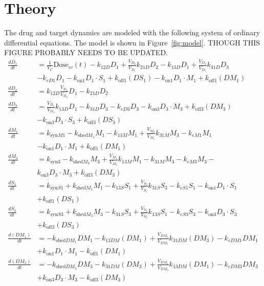 \section*{Theory}

The drug and target dynamics are modeled with the following system of ordinary differential equations.  The model is shown in Figure~\ref{fig:model}.  THOUGH THIS FIGURE PROBABLY NEEDS TO BE UPDATED.
\begin{align}
\frac{dD_1}{dt} &= \frac{1}{V_C}\text{Dose}_{iv}(t) - k_{12D}D_1 + \frac{V_{D_2}}{V_{D_1}}k_{21D}D_2 - k_{13D}D_1 \nonumber 
+ \frac{V_{D_3}}{V_{D_1}}k_{31D}D_3\\& - k_{eD1}D_1 - k_{\text{on}1}D_1 \cdot S_1 + k_{\text{off}1}(DS_1)- k_{\text{on}1}D_1 \cdot M_1 + k_{\text{off}1}(DM_1)  \\
\frac{dD_2}{dt} &= k_{12D}\frac{V_{D_1}}{V_{D_2}}D_1 - k_{21D}D_2 \\
\frac{dD_3}{dt} &= \frac{V_{D_1}}{V_{D_3}}k_{13D}D_1 - k_{31D}D_3 - k_{eD3}D_3- k_{\text{on}3}D_3 \cdot M_3 + k_{\text{off}3}(DM_3)\nonumber  \\&- k_{\text{on}3}D_3 \cdot S_3 + k_{\text{off}3}(DS_3) \\
\frac{dM_1}{dt} &= k_{\text{syn}M1}-k_{\text{shed}M_1}M_1 - k_{13M}M_1 + \frac{V_{M_3}}{V_{M_1}}k_{31M}M_3- k_{eM1}M_1\nonumber  \\&- k_{\text{on}1}D_1 \cdot M_1 + k_{\text{off}1}(DM_1)  \\
\frac{dM_3}{dt} &= k_{\text{syn}3}-k_{\text{shed}M_3}M_3  + \frac{V_{M_1}}{V_{M_3}}k_{13M}M_1 - k_{31M}M_3 - k_{eM3}M_3-\nonumber \\& k_{\text{on}3}D_3 \cdot M_3 + k_{\text{off}3}(DM_3) \\
\frac{dS_1}{dt} &= k_{\text{syn}S1}+k_{\text{shed}M_1}M_1  - k_{13S}S_1 + \frac{V_{S_3}}{V_{S_1}}k_{31S}S_3 - k_{eS1}S_1 - k_{\text{on}1}D_1 \cdot S_1 \nonumber\\ & + k_{\text{off}1}(DS_1)  \\
\frac{dS_3}{dt} &= k_{\text{syn}S3}+k_{\text{shed}M_3}M_3  - k_{31S}S_3 + \frac{V_{S_1}}{V_{S_3}}k_{13S}S_1 - k_{eS3}S_3 - k_{\text{on}3}D_3 \cdot S_3 \nonumber\\ & + k_{\text{off}3}(DS_3)  \\
\frac{d(DM_1)}{dt} &=-k_{\text{shed}DM_1}DM_1 - k_{13DM}(DM_1) + \frac{V_{DM_3}}{V_{DM_1}}k_{31DM}(DM_3)  - k_{eDM1}DM_1\nonumber\\&+k_{\text{on}1}D_1 \cdot M_1 - k_{\text{off}1}(DM_1)  \\
\frac{d(DM_3)}{dt} &= -k_{\text{shed}DM_3}DM_3 - k_{31DM}(DM_3) + \frac{V_{DM_1}}{V_{DM_3}}k_{13DM}(DM_1)  - k_{eDM3}DM_3\nonumber \\&+k_{\text{on}3}D_3 \cdot M_3 - k_{\text{off}3}(DM_3)  \\

\end{align}
